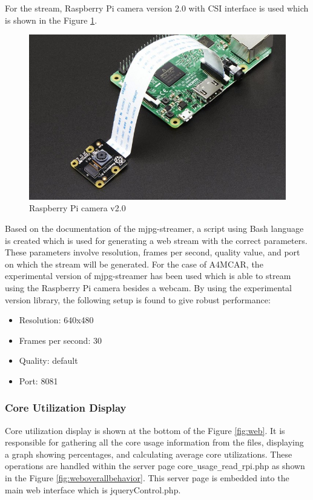 For the stream, Raspberry Pi camera version 2.0 with CSI interface is used which is shown in the Figure \ref{fig:rpicam20}.

\begin{figure}[!ht]
	\centering
	\captionsetup{justification=centering}
	\includegraphics[scale=0.5]{content/images/rpicam20.jpg}
	\caption{Raspberry Pi camera v2.0}
	\label{fig:rpicam20}
\end{figure}

Based on the documentation of the mjpg-streamer, a script using Bash language is created which is used for generating a web stream with the correct parameters. These parameters involve resolution, frames per second, quality value, and port on which the stream will be generated. For the case of A4MCAR, the experimental version of mjpg-streamer has been used which is able to stream using the Raspberry Pi camera besides a webcam. By using the experimental version library, the following setup is found to give robust performance:
\begin{itemize}
	\item Resolution:        640x480
	\item Frames per second: 30
	\item Quality:           default
	\item Port:              8081
\end{itemize}
\subsubsection{Core Utilization Display}
Core utilization display is shown at the bottom of the Figure \ref{fig:web}. It is responsible for gathering all the core usage information from the files, displaying a graph showing percentages, and calculating average core utilizations. These operations are handled within the server page core\texttt{\_}usage\texttt{\_}read\texttt{\_}rpi.php as shown in the Figure \ref{fig:weboverallbehavior}. This server page is embedded into the main web interface which is jqueryControl.php.

